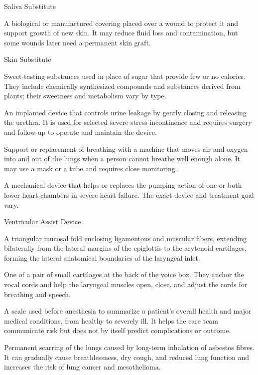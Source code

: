 \synonyms
Saliva Substitute

 A biological or manufactured covering placed over a wound to protect it and support growth of new skin. It may reduce fluid loss and contamination, but some wounds later need a permanent skin graft.

\synonyms
Skin Substitute

 Sweet-tasting substances used in place of
sugar that provide few or no calories. They include chemically synthesized
compounds and substances derived from plants; their sweetness and metabolism
vary by type.

 An implanted device that controls urine leakage by gently closing and releasing the urethra. It is used for selected severe stress incontinence and requires surgery and follow-up to operate and maintain the device.

 Support or replacement of breathing with a machine that moves air and oxygen into and out of the lungs when a person cannot breathe well enough alone. It may use a mask or a tube and requires close monitoring.

 A mechanical device that helps or replaces the pumping action of one or both lower heart chambers in severe heart failure. The exact device and treatment goal vary.

\synonyms
Ventricular Assist Device

 A triangular mucosal fold enclosing ligamentous and muscular fibers, extending bilaterally from the lateral margins of the epiglottis to the arytenoid cartilages, forming the lateral anatomical boundaries of the laryngeal inlet.

 One of a pair of small cartilages at the back of the voice box. They anchor the vocal cords and help the laryngeal muscles open, close, and adjust the cords for breathing and speech.

 A scale used before anesthesia to summarize a patient’s overall health and major medical conditions, from healthy to severely ill. It helps the care team communicate risk but does not by itself predict complications or outcome.

 Permanent scarring of the lungs caused by long-term inhalation of asbestos fibres. It can gradually cause breathlessness, dry cough, and reduced lung function and increases the risk of lung cancer and mesothelioma.

